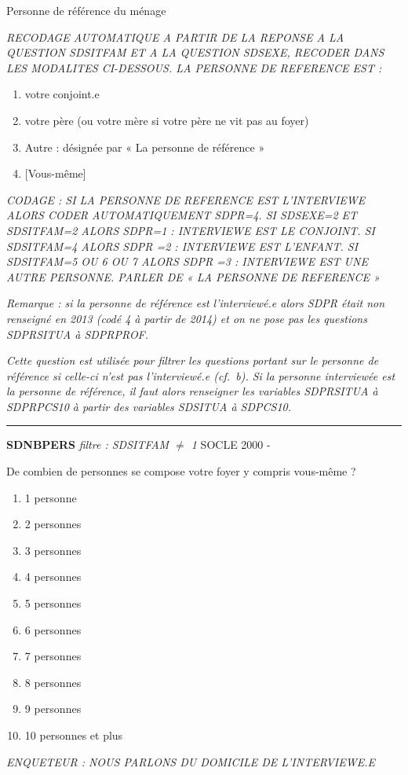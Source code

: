 \documentclass[12pt,a4paper]{reedthesis}
\providecommand{\tightlist}{%
  \setlength{\itemsep}{0pt}\setlength{\parskip}{0pt}}
\begin{document}
Personne de référence du ménage

\emph{RECODAGE AUTOMATIQUE A PARTIR DE LA REPONSE A LA QUESTION SDSITFAM ET A LA QUESTION SDSEXE, RECODER DANS LES MODALITES CI-DESSOUS. LA PERSONNE DE REFERENCE EST :}
\begin{enumerate}
\def\labelenumi{\arabic{enumi}.}
\tightlist
\item
  votre conjoint.e
\item
  votre père (ou votre mère si votre père ne vit pas au foyer)
\item
  Autre : désignée par « La personne de référence »
\item
  {[}Vous-même{]}
\end{enumerate}
\emph{CODAGE : SI LA PERSONNE DE REFERENCE EST L'INTERVIEWE ALORS CODER AUTOMATIQUEMENT SDPR=4. SI SDSEXE=2 ET SDSITFAM=2 ALORS SDPR=1 : INTERVIEWE EST LE CONJOINT. SI SDSITFAM=4 ALORS SDPR =2 : INTERVIEWE EST L'ENFANT. SI SDSITFAM=5 OU 6 OU 7 ALORS SDPR =3 : INTERVIEWE EST UNE AUTRE PERSONNE. PARLER DE « LA PERSONNE DE REFERENCE »}

\emph{Remarque : si la personne de référence est l'interviewé.e alors SDPR était non renseigné en 2013 (codé 4 à partir de 2014) et on ne pose pas les questions SDPRSITUA à SDPRPROF. }

\emph{Cette question est utilisée pour filtrer les questions portant sur le personne de référence si celle-ci n'est pas l'interviewé.e (cf.~b). Si la personne interviewée est la personne de référence, il faut alors renseigner les variables SDPRSITUA à SDPRPCS10 à partir des variables SDSITUA à SDPCS10. }
\begin{center}\rule{0.5\linewidth}{0.5pt}\end{center}

\textbf{SDNBPERS} \emph{filtre : SDSITFAM \(\neq\) 1} SOCLE 2000 -

De combien de personnes se compose votre foyer y compris vous-même ?
\begin{enumerate}
\def\labelenumi{\arabic{enumi}.}
\tightlist
\item
  1 personne
\item
  2 personnes
\item
  3 personnes
\item
  4 personnes
\item
  5 personnes
\item
  6 personnes
\item
  7 personnes
\item
  8 personnes
\item
  9 personnes
\item
  10 personnes et plus
\end{enumerate}
\emph{ENQUETEUR : NOUS PARLONS DU DOMICILE DE L'INTERVIEWE.E}
\end{document}
